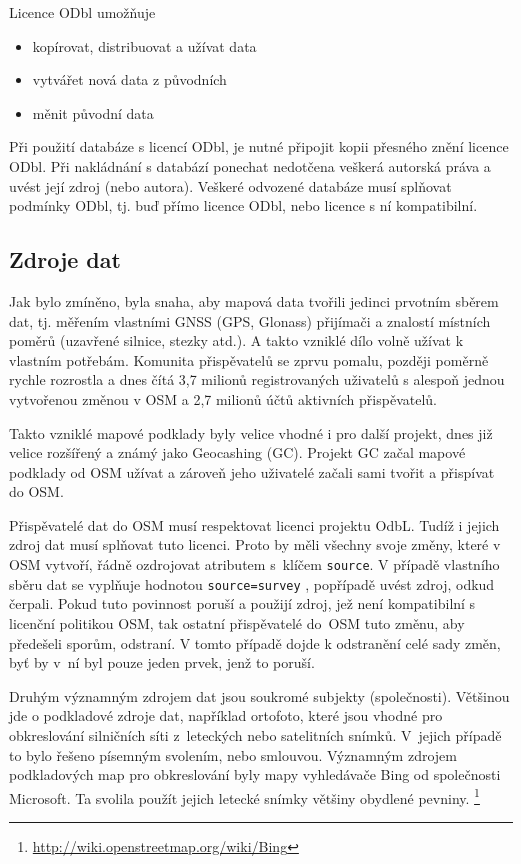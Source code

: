 Licence ODbl umožňuje
\begin{itemize}
    \item    kopírovat, distribuovat a užívat data
    \item    vytvářet nová data z původních
    \item    měnit původní data
\end{itemize}

Při použití databáze s licencí ODbl, je
nutné připojit kopii přesného znění licence ODbl.
Při nakládnání s databází ponechat nedotčena veškerá autorská práva a
uvést její zdroj (nebo autora).
Veškeré odvozené databáze musí splňovat podmínky ODbl,
tj. buď přímo licence ODbl, nebo licence s ní kompatibilní.
\cite{Nesetril2013thesis}

\subsection{Zdroje dat}
\label{Zdroje dat}
Jak bylo zmíněno, byla snaha, aby mapová data tvořili jedinci prvotním
sběrem dat, tj. měřením vlastními GNSS (GPS, Glonass) přijímači a
znalostí místních poměrů (uzavřené silnice, stezky atd.).  A takto
vzniklé dílo volně užívat k vlastním potřebám. Komunita přispěvatelů se
zprvu pomalu, později poměrně rychle rozrostla a dnes čítá 3,7 milionů
registrovaných uživatelů s alespoň jednou vytvořenou změnou v OSM a
2,7 milionů účtů aktivních přispěvatelů.\cite{OSMstats}

Takto vzniklé mapové podklady byly velice vhodné i pro další projekt, dnes již
velice rozšířený a známý jako Geocashing (GC). Projekt GC začal mapové
podklady od OSM užívat a zároveň jeho uživatelé začali sami tvořit a
přispívat do OSM. 

Přispěvatelé dat do OSM musí respektovat licenci projektu OdbL.
Tudíž i jejich zdroj dat musí splňovat tuto licenci. Proto by měli
všechny svoje změny, které v OSM vytvoří, řádně ozdrojovat atributem
s~klíčem 
{\tt source}.
V případě vlastního sběru dat se vyplňuje hodnotou
{\tt source=survey} ,
popřípadě uvést zdroj, odkud čerpali. Pokud tuto povinnost poruší a
použijí zdroj, jež není kompatibilní s licenční politikou OSM, tak ostatní 
přispěvatelé do~OSM tuto změnu, aby předešeli sporům, odstraní. 
V tomto případě dojde k odstranění celé sady změn, byť by v~ní byl pouze jeden prvek, jenž to poruší.

Druhým významným zdrojem dat jsou soukromé subjekty (společnosti).
Většinou jde o podkladové zdroje dat, například ortofoto, které jsou
vhodné pro obkreslování silničních síti z~leteckých nebo
satelitních snímků. V~jejich případě to
bylo řešeno písemným svolením, nebo smlouvou. Významným zdrojem
podkladových map pro obkreslování byly mapy vyhledávače Bing od společnosti
Microsoft. Ta svolila použít jejich letecké snímky většiny
obydlené pevniny. \footnote{\url{http://wiki.openstreetmap.org/wiki/Bing}}

